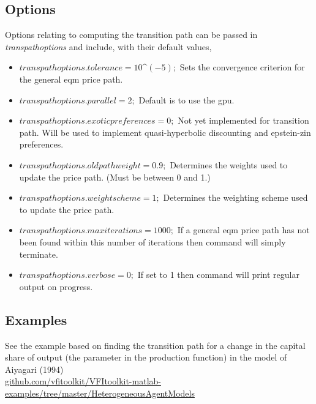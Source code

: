 \subsection{Options}
Options relating to computing the transition path can be passed in \textit{transpathoptions} and include, with their default values,
\begin{itemize}
 \item $transpathoptions.tolerance=10$\^{}$(-5);$ Sets the convergence criterion for the general eqm price path.
 \item $transpathoptions.parallel=2;$ Default is to use the gpu.
 \item $transpathoptions.exoticpreferences=0;$ Not yet implemented for transition path. Will be used to implement quasi-hyperbolic discounting and epstein-zin preferences.
 \item $transpathoptions.oldpathweight=0.9;$ Determines the weights used to update the price path. (Must be between 0 and 1.)
 \item $transpathoptions.weightscheme=1;$ Determines the weighting scheme used to update the price path.
 \item $transpathoptions.maxiterations=1000;$ If a general eqm price path has not been found within this number of iterations then command will simply terminate.
 \item $transpathoptions.verbose=0;$ If set to 1 then command will print regular output on progress.
\end{itemize}

\subsection{Examples}
See the example based on finding the transition path for a change in the capital share of output (the parameter in the production function) in the model of Aiyagari (1994) \\
\href{https://github.com/vfitoolkit/VFItoolkit-matlab-examples/tree/master/HeterogeneousAgentModels}{github.com/vfitoolkit/VFItoolkit-matlab-examples/tree/master/HeterogeneousAgentModels}

